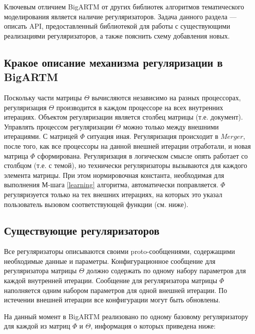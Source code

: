 
Ключевым отличием BigARTM от других библиотек алгоритмов тематического моделирования является наличие регуляризаторов. Задача данного раздела --- описать API, предоставленный библиотекой для работы с существующими реализациями регуляризаторов, а также пояснить схему добавления новых.

\subsection{Кракое описание механизма регуляризации в BigARTM}
Поскольку части матрицы $\Theta$ вычисляются независимо на разных процессорах, регуляризация $\Theta$ производится в каждом процессоре на всех внутренних итерациях. Объектом регуляризации является столбец матрицы (т.е. документ). Управлять процессом регуляризации $\Theta$ можно только между внешними итерациями. С матрицей $\Phi$ ситуация иная. Регуляризация происходит в $Merger$, после того, как все процессоры на данной внешней итерации отработали, и новая матрица $\Phi$ сформирована. Регуляризация в логическом смысле опять работает со столбцом (т.е. с темой), но технически регуляризаторы вызываются для каждого элемента матрицы. При этом нормировочная константа, необходимая для выполнения М-шага \ref{learning} алгоритма, автоматически поправляется. $\Phi$ регуляризуется только на тех внешних итерациях, на которых это указал пользователь вызовом соответствующей функции (см. ниже). 

\subsection{Существующие регуляризаторов}

Все регуляризаторы описываются своими proto-сообщениями, содержащими необходимые данные и параметры. Конфигурационное сообщение для регуляризатора матрицы $\Theta$ должно содержать по одному набору параметров для каждой внутренней итерации. Сообщение для регуляризатора матрицы $\Phi$ наполняется одним набором параметров для одной внешней итерации. По истечении внешней итерации все конфигурации могут быть обновлены.

На данный момент в BigARTM реализовано по одному базовому регуляризатору для каждой из матриц $\Phi$ и $\Theta$, информация о которых приведена ниже:

